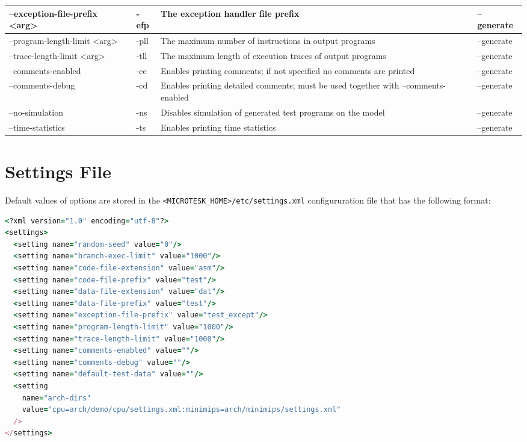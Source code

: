 \documentclass[oneside,final,12pt]{extreport}
\begin{document}
\begin{tabular}{ | p{4cm} | p{1cm} | p{5cm} | p{2.5cm} |}
  \hline
  --exception-file-prefix <arg> & -efp & The exception handler file prefix & --generate \\ \hline
  --program-length-limit <arg> & -pll & The maximum number of instructions in output programs & --generate \\ \hline
  --trace-length-limit <arg> & -tll & The maximum length of execution traces of output programs & --generate \\ \hline
  --comments-enabled & -ce & Enables printing comments; if not specified no comments are printed & --generate \\ \hline
  --comments-debug & -cd & Enables printing detailed comments; must be used together with --comments-enabled  & --generate \\ \hline
  --no-simulation & -ns & Disables simulation of generated test programs on the model & --generate \\ \hline
  --time-statistics & -ts & Enables printing time statistics & --generate \\ \hline
\end{tabular}

\section{Settings File}

Default values of options are stored in the \texttt{<MICROTESK{\_}HOME>/etc/settings.xml}
configururation file that has the following format:

\begin{lstlisting}[language=ruby]
<?xml version="1.0" encoding="utf-8"?>
<settings>
  <setting name="random-seed" value="0"/>
  <setting name="branch-exec-limit" value="1000"/>
  <setting name="code-file-extension" value="asm"/>
  <setting name="code-file-prefix" value="test"/>
  <setting name="data-file-extension" value="dat"/>
  <setting name="data-file-prefix" value="test"/>
  <setting name="exception-file-prefix" value="test_except"/>
  <setting name="program-length-limit" value="1000"/>
  <setting name="trace-length-limit" value="1000"/>
  <setting name="comments-enabled" value=""/>
  <setting name="comments-debug" value=""/>
  <setting name="default-test-data" value=""/>
  <setting
    name="arch-dirs" 
    value="cpu=arch/demo/cpu/settings.xml:minimips=arch/minimips/settings.xml"
  />
</settings>
\end{lstlisting}
\end{document}
